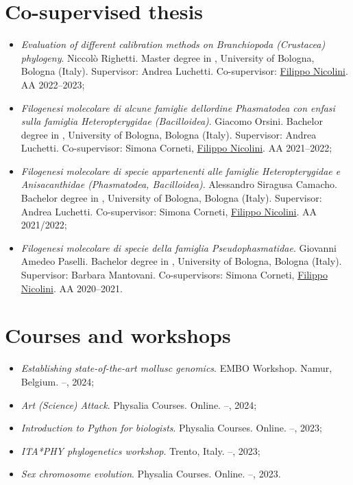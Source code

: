 \section*{Co-supervised thesis}
\begin{itemize}
    \item \textit{Evaluation of different calibration methods on Branchiopoda (Crustacea) phylogeny}. Niccolò Righetti. Master degree in , University of Bologna, Bologna (Italy). Supervisor: Andrea Luchetti. Co-supervisor: \underline{Filippo Nicolini}. AA 2022--2023;
    \item \textit{Filogenesi molecolare di alcune famiglie dell\curlyapostrophe ordine Phasmatodea con enfasi sulla famiglia Heteropterygidae (Bacilloidea)}. Giacomo Orsini. Bachelor degree in , University of Bologna, Bologna (Italy). Supervisor: Andrea Luchetti. Co-supervisor: Simona Corneti, \underline{Filippo Nicolini}. AA 2021--2022;
    \item \textit{Filogenesi molecolare di specie appartenenti alle famiglie Heteropterygidae e Anisacanthidae (Phasmatodea, Bacilloidea)}. Alessandro Siragusa Camacho. Bachelor degree in , University of Bologna, Bologna (Italy). Supervisor: Andrea Luchetti. Co-supervisor: Simona Corneti, \underline{Filippo Nicolini}. AA 2021/2022;
    \item \textit{Filogenesi molecolare di specie della famiglia Pseudophasmatidae}. Giovanni Amedeo Paselli. Bachelor degree in , University of Bologna, Bologna (Italy). Supervisor: Barbara Mantovani. Co-supervisors: Simona Corneti, \underline{Filippo Nicolini}. AA 2020--2021.
\end{itemize}

\section*{Courses and workshops}
\begin{itemize}
    \item \textit{Establishing state-of-the-art mollusc genomics}. EMBO Workshop. Namur, Belgium.  --, 2024;
    \item \textit{Art (Science) Attack}. Physalia Courses. Online.  --, 2024;
    \item \textit{Introduction to Python for biologists}. Physalia Courses. Online.  --, 2023;
    \item \textit{ITA*PHY phylogenetics workshop}. Trento, Italy.  --, 2023;
    \item \textit{Sex chromosome evolution}. Physalia Courses. Online.  --, 2023.
\end{itemize}

